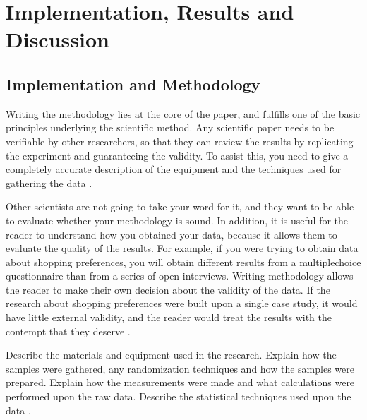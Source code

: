 \documentclass[letterpaper,10pt,english]{sphinxmanual}
\begin{document}
\sphinxstepscope


\section{Implementation, Results and Discussion}
\label{\detokenize{docs/ShavitFranchezAlg/results:implementation-results-and-discussion}}\label{\detokenize{docs/ShavitFranchezAlg/results::doc}}

\subsection{Implementation and Methodology}
\label{\detokenize{docs/ShavitFranchezAlg/results:implementation-and-methodology}}
\sphinxAtStartPar
Writing the methodology lies at the core of the paper, and fulfills one of the basic principles underlying the scientific method. Any scientific paper needs to be verifiable by other researchers, so that they can review the results by replicating the experiment and guaranteeing the validity. To assist this, you need to give a completely accurate description of the equipment and the techniques used for gathering the data .

\sphinxAtStartPar
Other scientists are not going to take your word for it, and they want to be able to evaluate whether your methodology is sound. In addition, it is useful for the reader to understand how you obtained your data, because it allows them to evaluate the quality of the results. For example, if you were trying to obtain data about shopping preferences, you will obtain different results from a multiple\sphinxhyphen{}choice questionnaire than from a series of open interviews. Writing methodology allows the reader to make their own decision about the validity of the data. If the research about shopping preferences were built upon a single case study, it would have little external validity, and the reader would treat the results with the contempt that they deserve .

\sphinxAtStartPar
Describe the materials and equipment used in the research. Explain how the samples were gathered, any randomization techniques and how the samples were prepared. Explain how the measurements were made and what calculations were performed upon the raw data. Describe the statistical techniques used upon the data .
\end{document}
